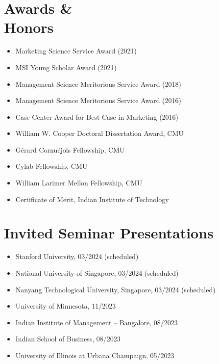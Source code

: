 \documentclass[margin, line, centered, 10pt]{res}
\begin{document}
\begin{resume}
\section{\sc Awards \&\\ Honors}
\begin{itemize}
\item Marketing Science Service Award (2021)
\item MSI Young Scholar Award (2021)
\item Management Science Meritorious Service Award (2018)
\item Management Science Meritorious Service Award (2016)
\item Case Center Award for Best Case in Marketing (2016) %
\item William W. Cooper Doctoral Dissertation Award, CMU %
\item G\'{e}rard Cornu\'{e}jols Fellowship, CMU %
\item Cylab Fellowship, CMU %
\item William Larimer Mellon Fellowship, CMU%
\item Certificate of Merit, Indian Institute of Technology %
\end{itemize}


\section{\sc Invited Seminar Presentations}
\begin{itemize}
\item Stanford University, 03/2024 (scheduled)
\item National University of Singapore, 03/2024 (scheduled)
\item Nanyang Technological University, Singapore, 03/2024 (scheduled)
\item University of Minnesota, 11/2023
\item Indian Institute of Management – Bangalore, 08/2023
\item Indian School of Business, 08/2023
\item University of Illinois at Urbana Champaign, 05/2023


\end{itemize}
\end{resume}
\end{document}
